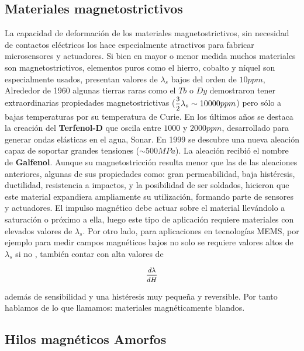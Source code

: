 \subsection{Materiales magnetostrictivos}

La capacidad de deformación de los materiales magnetostrictivos, sin necesidad de contactos eléctricos los hace especialmente atractivos para fabricar microsensores y actuadores. Si bien en mayor o menor medida muchos materiales son magnetostrictivos, elementos puros como el hierro, cobalto y níquel son especialmente usados, presentan valores de $\lambda_{s}$ bajos del orden de $10ppm$, Alrededor de 1960 algunas tierras raras como el $Tb$ o $Dy$ demostraron tener extraordinarias propiedades magnetostrictivas ($\mfrac{3}{2}\lambda_{s} \sim 10000 ppm$) pero sólo a bajas temperaturas por su temperatura de Curie. En los últimos años se destaca la creación del \textbf{Terfenol-D} que oscila entre $1000$ y $2000ppm$, desarrollado para generar ondas elásticas en el agua, Sonar. En 1999 se descubre una nueva aleación capaz de soportar grandes tensiones ($\sim 500 MPa$). La aleación recibió el nombre de \textbf{Galfenol}. Aunque su magnetostricción resulta menor que las de las aleaciones anteriores, algunas de sus propiedades como: gran permeabilidad, baja histéresis, ductilidad, resistencia a impactos, y la posibilidad de ser soldados, hicieron que este material expandiera ampliamente su utilización, formando parte de sensores y actuadores. El impulso magnético debe actuar sobre el material llevándolo a saturación o próximo a ella, luego este tipo de aplicación requiere materiales con elevados valores de $\lambda_{s}$. Por otro lado, para aplicaciones en tecnologías MEMS, por ejemplo para medir campos magnéticos bajos no solo se requiere valores altos de $\lambda_{s}$ si no , también contar con alta valores de 


\begin{equation}
	\mfrac{d\lambda}{dH}
\end{equation}

además de sensibilidad y una histéresis muy pequeña y reversible. Por tanto hablamos de lo que llamamos: materiales magnéticamente blandos.


\subsection{Hilos magnéticos Amorfos}

